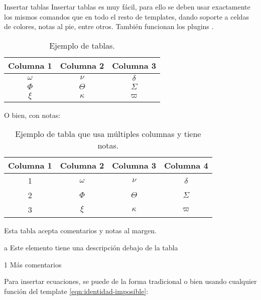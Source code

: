 \begin{block}{Insertar tablas}
	Insertar tablas es muy fácil, para ello se deben usar exactamente los mismos comandos que en todo el resto de templates, dando soporte a celdas de colores, notas al pie, entre otros. También funcionan los plugins \cite{tablesgenerator, excel2latex}.
	
	\begin{table}[H]
		\centering
		\caption{Ejemplo de tablas.}
		\begin{tabular}{ccc}
			\hline
			\textbf{Columna 1} & \textbf{Columna 2} & \textbf{Columna 3} \bigstrut\\
			\hline
			$\omega$ & $\nu$ & $\delta$ \bigstrut[t]\\
			$\Phi$ & $\Theta$ & $\varSigma$ \\
			$\xi$ & $\kappa$ & $\varpi$ \bigstrut[b] \\
			\hline
		\end{tabular}
		\label{tab:tabla-1}
	\end{table}

	O bien, con notas:
	
	\begin{table}
		\begin{threeparttable}
			\centering
			\caption{Ejemplo de tabla que usa múltiples columnas y tiene notas.}
			\begin{tabular}{cccc}
				\hline
				\textbf{Columna 1} & \textbf{Columna 2} & \textbf{Columna 3} & \textbf{Columna 4} \bigstrut\\
				\hline
				1 & $\omega$ & $\nu$ & $\delta$ \tnote{a} \\
				2 & $\Phi$ & $\Theta$ & $\varSigma$ \tnote{1} \\
				3 & $\xi$ & $\kappa$ & $\varpi$ \\
				\hline
			\end{tabular}
			\begin{tablenotes}
				Esta tabla acepta comentarios y notas al margen.
				\item[a] Este elemento tiene una descripción debajo de la tabla
				\item[1] Más comentarios
			\end{tablenotes}
		\end{threeparttable}
	\end{table}

	Para insertar ecuaciones, se puede de la forma tradicional o bien usando cualquier función del template \ref{eqn:identidad-imposible}:
	
\end{block}


